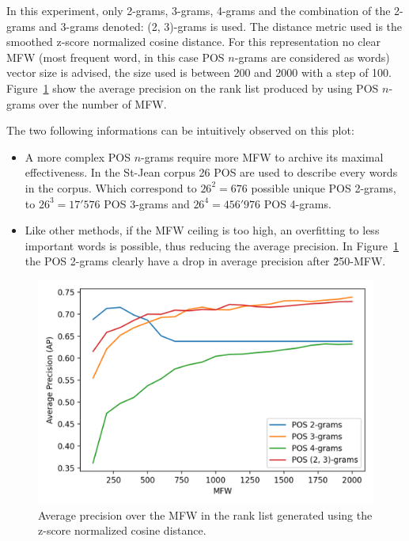 In this experiment, only 2-grams, 3-grams, 4-grams and the combination of the 2-grams and 3-grams denoted: (2, 3)-grams is used.
The distance metric used is the smoothed z-score normalized cosine distance.
For this representation no clear MFW (most frequent word, in this case POS $n$-grams are considered as words) vector size is advised, the size used is between 200 and 2000 with a step of 100.
Figure~\ref{fig:pos_ngrams} show the average precision on the rank list produced by using POS $n$-grams over the number of MFW.

The two following informations can be intuitively observed on this plot:
\begin{itemize}
  \item
  A more complex POS $n$-grams require more MFW to archive its maximal effectiveness.
  In the St-Jean corpus 26 POS are used to describe every words in the corpus.
  Which correspond to $26^2 = 676$ possible unique POS 2-grams, to $26^3 = 17'576$ POS 3-grams and $26^4 = 456'976$ POS 4-grams.
  \item
  Like other methods, if the MFW ceiling is too high, an overfitting to less important words is possible, thus reducing the average precision.
  In Figure~\ref{fig:pos_ngrams} the POS 2-grams clearly have a drop in average precision after \~250-MFW.
\end{itemize}

\begin{figure}
  \centering
  \caption{Average precision over the MFW in the rank list generated using the z-score normalized cosine distance.}
  \label{fig:pos_ngrams}
  \includegraphics[width=\linewidth]{img/pos_ngrams.png}
\end{figure}

